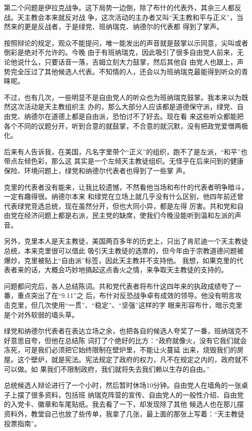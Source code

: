 ﻿\documentclass[11pt]{article}
\begin{document}
第二个问题是伊拉克战争。这下局势一边倒，除了布什的代表外，其余三人都反战。天主教会本来就反对战
争，这次活动的主办者又叫``天主教和平与正义''，当然来的更是反战者，于是绿党、班纳瑞克、纳德尔的代表都
得到了掌声。

按照辩论的规定，观众不能提问，唯一能发出的声音就是鼓掌以示同意，尖叫或者倒彩是绝对不允许的。今晚
由于有班纳瑞克，因此吸引了很多自由党人前来，无论他说什么，只要话音一落，吉姆立刻大力鼓掌，然后其他自
由党人也跟上，声势完全压过了其他候选人代表。不知情的人，还会以为班纳瑞克最能得到听众的青睐呢。


不过，也有几次，一些明显不是自由党人的听众也为班纳瑞克鼓掌。我本来以为既然这次活动是天主教组织主
办的，那么大部分人应该都是道德保守派，绿党、自由党、纳德尔在道德上都是自由派，恐怕讨不了好去。现在看
来这些听众都能把各个不同的议题分开，听到合意的就鼓掌，不合意的就沉默，没有把政党爱憎两极化。

后来有人告诉我，在美国，凡名字里带个``正义''的组织，跑不了是左派，``和平''也带点左倾色彩，那么这
其实是一个左倾天主教徒组织。无怪乎在后来问到的健康保险、环境问题上，绿党和纳德尔代表者也得到了一些掌
声。

克里的代表者没有能来，让我比较遗憾，不然看他当场和布什的代表者明争暗斗，一定有趣得很。纳德尔本来
和绿党在立场上就几乎没有什么区别，他四年前还曾代表绿党竞选总统，现在虽然分开，但也大同小异，都是左得
厉害。共和党和自由党在经济问题上都是右派，民主党的缺席，使我们今晚没能听到温和左派的声音。

另外，克里本人是天主教徒，美国两百多年的历史上，只出了肯尼迪一个天主教徒总统，本来克里很可以借此
吸引天主教徒的选票的，但今年由于宗教道德问题被爆炒，克里被贴上``自由派''标签，因此天主教并不支持他。
我想，如果克里的代表者来的话，大概会巧妙地搞起这点香火之情，来争取天主教徒的支持的。

问题都问完后，各人总结陈词。共和党代表者将布什这四年来的执政成绩夸了一番，重点突出了在``9.11''之
后，布什对反恐战争卓有成效的领导。他没有明言攻击克里，但几次使用``一贯''、``稳定''、``坚强''这样的字
眼来形容布什，暗示克里是个对外软弱的墙头草。

绿党和纳德尔代表者在表达立场之余，也把各自的候选人夸奖了一番，班纳瑞克不好意思自夸，但他在总结陈
词打了个绝好的比方：``政府就像火，没有它我们就会冻死，可是我们必须把它始终限制在壁炉里，不能让火蔓延
出来，烧毁我们的房屋。这个壁炉，就是宪法。宪法规定了政府的权力，凡不在规定之内的，政府就不可以做。如
果我们不限制政府，我们就将失去我们赖以生存的自由。''

总统候选人辩论进行了一个小时，然后暂时休场10分钟。自由党人在墙角的一张桌子上摆了很多资料，包括班
纳瑞克阵营的宣传、自由党人的一般性介绍、自由党的入党卡、徽章和车尾贴纸。我去看了一下，却发现除了其他
候选人也在那儿摆资料外，教堂自己也放了些传单，我拿了几张，最上面的那张上写着：``天主教徒投票指南''。
\end{document}
